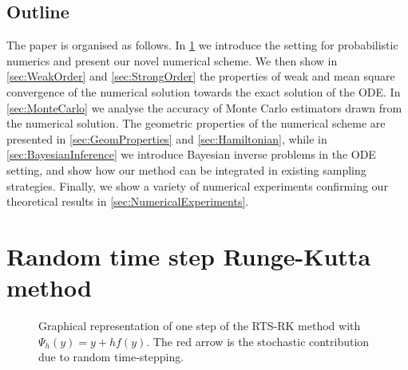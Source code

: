 \documentclass[10pt]{article}
\begin{document}
\subsection{Outline} The paper is organised as follows. In \cref{sec:MethodIntro} we introduce the setting for probabilistic numerics and present our novel numerical scheme. We then show in \cref{sec:WeakOrder} and \cref{sec:StrongOrder} the properties of weak and mean square convergence of the numerical solution towards the exact solution of the ODE. In \cref{sec:MonteCarlo} we analyse the accuracy of Monte Carlo estimators drawn from the numerical solution. The geometric properties of the numerical scheme are presented in \cref{sec:GeomProperties} and \cref{sec:Hamiltonian}, while in \cref{sec:BayesianInference} we introduce Bayesian inverse problems in the ODE setting, and show how our method can be integrated in existing sampling strategies. Finally, we show a variety of numerical experiments confirming our theoretical results in \cref{sec:NumericalExperiments}.


\section{Random time step Runge-Kutta method}\label{sec:MethodIntro}

\begin{figure}
\centering
{}
\caption{Graphical representation of one step of the RTS-RK method with $\Psi_h(y) = y + hf(y)$. The red arrow is the stochastic contribution due to random time-stepping.}
\label{fig:GraphRandomStep}
\end{figure}
\end{document}
